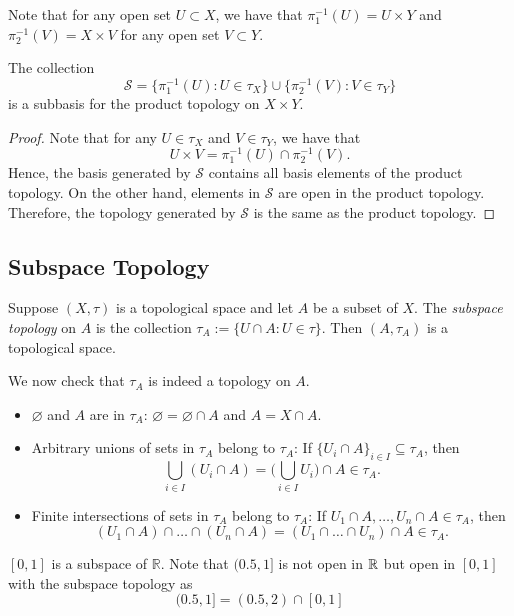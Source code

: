 Note that for any open set $U\subset X$, we have that $\pi_1^{-1}(U) = U\times Y$ and $\pi_2^{-1}(V) = X\times V$ for any open set $V\subset Y$.

\begin{theorem}
  The collection 
  \[\mathcal{S}=\{\pi_1^{-1}(U): U\in{\tau}_X\}\cup \{\pi_2^{-1}(V): V\in{\tau}_Y\}\]
  is a subbasis for the product topology on $X\times Y$.
\end{theorem}

\begin{proof}
  Note that for any $U\in\tau_X$ and $V\in\tau_Y$, we have that 
  \[U\times V = \pi_1^{-1}(U)\cap \pi_2^{-1}(V).\]
  Hence, the basis generated by $\mathcal{S}$ contains all basis elements of the product topology. On the other hand, elements in $\mathcal{S}$ are open in the product topology. Therefore, the topology generated by $\mathcal{S}$ is the same as the product topology. 
\end{proof}



\subsection{Subspace Topology}

\begin{definition}
  Suppose $(X,{\tau})$ is a topological space and let $A$ be a subset of $X$. The \emph{subspace topology} on $A$ is the collection ${\tau}_A := \{ U \cap A : U \in {\tau} \}$. Then $(A,{\tau}_A)$ is a topological space.
\end{definition}

We now check that ${\tau}_A$ is indeed a topology on $A$.
\begin{itemize}
  \item $\varnothing$ and $A$ are in ${\tau}_A$: $\varnothing = \varnothing \cap A$ and $A = X \cap A$.
  \item Arbitrary unions of sets in ${\tau}_A$ belong to ${\tau}_A$: If $\{U_i \cap A\}_{i \in I} \subseteq {\tau}_A$, then
  \[
    \bigcup_{i \in I} (U_i \cap A) = \Big(\bigcup_{i \in I} U_i\Big) \cap A \in {\tau}_A.
  \]
  \item Finite intersections of sets in ${\tau}_A$ belong to ${\tau}_A$: If $U_1 \cap A,\ldots, U_n \cap A \in {\tau}_A$, then
  \[
    (U_1 \cap A) \cap\ldots\cap (U_n \cap A) = (U_1 \cap \ldots\cap U_n) \cap A \in {\tau}_A.
  \]
\end{itemize}

\begin{example}
  $[0,1]$ is a subspace of $\mathbb{R}$. Note that $(0.5,1]$ is not open in $\mathbb{R}$ but open in $[0,1]$ with the subspace topology as $$(0.5,1] = (0.5,2) \cap [0,1]$$
\end{example}

